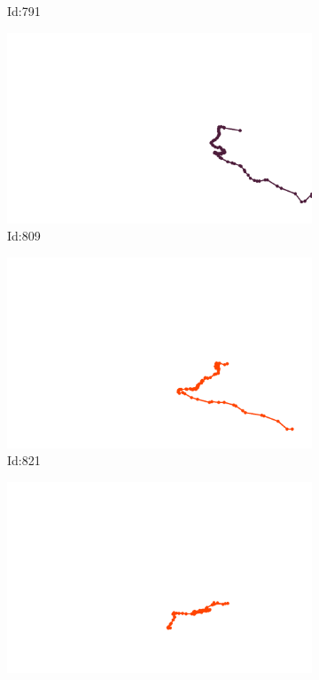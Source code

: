\documentclass[12pt,twoside]{report}
\begin{document}
\begin{figure}
\begin{subfigure}[b]{0.20\textwidth}
\caption{Id:791}
\end{subfigure}
\begin{subfigure}[b]{0.20\textwidth}
\centering
\includegraphics[width=\textwidth]{../trajectories/809.png}
\caption{Id:809}
\end{subfigure}
\begin{subfigure}[b]{0.20\textwidth}
\centering
\includegraphics[width=\textwidth]{../trajectories/821.png}
\caption{Id:821}
\end{subfigure}
\begin{subfigure}[b]{0.20\textwidth}
\centering
\includegraphics[width=\textwidth]{../trajectories/842.png}

\end{subfigure}
\end{figure}
\end{document}
